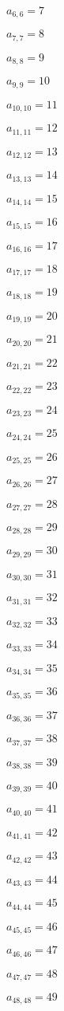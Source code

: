 \documentclass[a4paper,12pt]{article}
\begin{document}
$a _{ 6, 6 } = 7$

$a _{ 7, 7 } = 8$

$a _{ 8, 8 } = 9$

$a _{ 9, 9 } = 10$

$a _{ 10, 10 } = 11$

$a _{ 11, 11 } = 12$

$a _{ 12, 12 } = 13$

$a _{ 13, 13 } = 14$

$a _{ 14, 14 } = 15$

$a _{ 15, 15 } = 16$

$a _{ 16, 16 } = 17$

$a _{ 17, 17 } = 18$

$a _{ 18, 18 } = 19$

$a _{ 19, 19 } = 20$

$a _{ 20, 20 } = 21$

$a _{ 21, 21 } = 22$

$a _{ 22, 22 } = 23$

$a _{ 23, 23 } = 24$

$a _{ 24, 24 } = 25$

$a _{ 25, 25 } = 26$

$a _{ 26, 26 } = 27$

$a _{ 27, 27 } = 28$

$a _{ 28, 28 } = 29$

$a _{ 29, 29 } = 30$

$a _{ 30, 30 } = 31$

$a _{ 31, 31 } = 32$

$a _{ 32, 32 } = 33$

$a _{ 33, 33 } = 34$

$a _{ 34, 34 } = 35$

$a _{ 35, 35 } = 36$

$a _{ 36, 36 } = 37$

$a _{ 37, 37 } = 38$

$a _{ 38, 38 } = 39$

$a _{ 39, 39 } = 40$

$a _{ 40, 40 } = 41$

$a _{ 41, 41 } = 42$

$a _{ 42, 42 } = 43$

$a _{ 43, 43 } = 44$

$a _{ 44, 44 } = 45$

$a _{ 45, 45 } = 46$

$a _{ 46, 46 } = 47$

$a _{ 47, 47 } = 48$

$a _{ 48, 48 } = 49$
\end{document}
